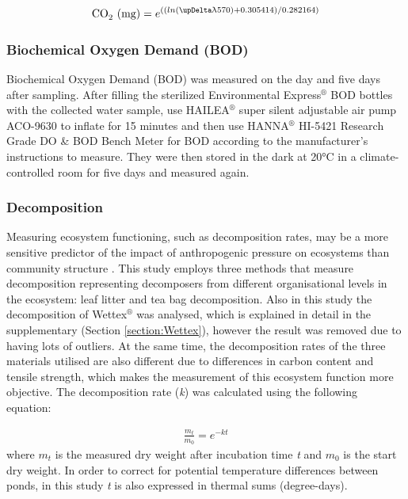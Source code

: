 \documentclass[11pt, a4paper]{article}
\begin{document}
\begin{spacing}{1.5}
\begin{align}\label{eq:MicroResp}
    \operatorname{\ce{CO2}\ (mg)} = e^{\left((ln(\upDelta \uplambda570) + 0.305414) / 0.282164 \right)}
\end{align}

\subsubsection{Biochemical Oxygen Demand (BOD)}\label{section:M_BOD}

Biochemical Oxygen Demand (BOD) was measured on the day and five days after sampling. After filling the sterilized Environmental Express$^\circledR$ BOD bottles with the collected water sample, use HAILEA$^\circledR$ super silent adjustable air pump ACO-9630 to inflate for 15 minutes and then use HANNA$^\circledR$ HI-5421 Research Grade DO \& BOD Bench Meter for BOD according to the manufacturer's instructions to measure. They were then stored in the dark at 20°C in a climate-controlled room for five days and measured again.

\subsubsection{Decomposition}\label{section:M_Decomposition}

Measuring ecosystem functioning, such as decomposition rates, may be a more sensitive predictor of the impact of anthropogenic pressure on ecosystems than community structure \citep{gessner2002case}. This study employs three methods that measure decomposition representing decomposers from different organisational levels in the ecosystem: leaf litter and tea bag decomposition. Also in this study the decomposition of Wettex$^\circledR$ was analysed, which is explained in detail in the supplementary (Section \ref{section:Wettex}), however the result was removed due to having lots of outliers. At the same time, the decomposition rates of the three materials utilised are also different due to differences in carbon content and tensile strength, which makes the measurement of this ecosystem function more objective. The decomposition rate (\textit{k}) was calculated using the following equation:

\begin{align}\label{eq:Decomposition}
    \frac{m_t}{m_0} = e^{-kt}
\end{align}
where $m_t$ is the measured dry weight after incubation time \textit{t} and $m_0$ is the start dry weight. In order to correct for potential temperature differences between ponds, in this study \textit{t} is also expressed in thermal sums (degree-days).


\end{spacing}
\end{document}
